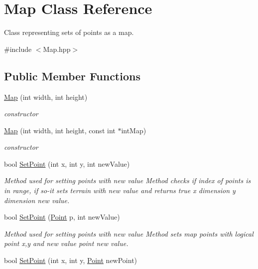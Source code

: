 \hypertarget{class_map}{}\section{Map Class Reference}
\label{class_map}


Class representing sets of points as a map.  




{\ttfamily \#include $<$Map.\+hpp$>$}

\subsection*{Public Member Functions}
\begin{DoxyCompactItemize}
\item 
\mbox{\hyperlink{class_map_a8497952fd6e1f0584d868e6ceb97d42d}{Map}} (int width, int height)
\begin{DoxyCompactList}\small\item\em constructor \end{DoxyCompactList}\item 
\mbox{\hyperlink{class_map_a953c6ae29b27d415572a016bcf55e768}{Map}} (int width, int height, const int $\ast$int\+Map)
\begin{DoxyCompactList}\small\item\em constructor \end{DoxyCompactList}\item 
bool \mbox{\hyperlink{class_map_a6456ee3beb19614b6ae03a04414d048a}{Set\+Point}} (int x, int y, int new\+Value)
\begin{DoxyCompactList}\small\item\em Method used for setting points with new value Method checks if index of point\textquotesingle{}s is in range, if so-\/it set\textquotesingle{}s terrain with new value and returns true  x dimension  y dimension  new value. \end{DoxyCompactList}\item 
bool \mbox{\hyperlink{class_map_a68903a79aac7c1680b59329ff1b14579}{Set\+Point}} (\mbox{\hyperlink{class_point}{Point}} p, int new\+Value)
\begin{DoxyCompactList}\small\item\em Method used for setting points with new value Method sets map points with logical point x,y and new value  point  new value. \end{DoxyCompactList}\item 
bool \mbox{\hyperlink{class_map_aa1133d277379166a0f4703b6e17849c1}{Set\+Point}} (int x, int y, \mbox{\hyperlink{class_point}{Point}} new\+Point)

\end{DoxyCompactItemize}
